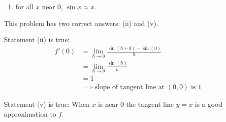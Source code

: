 \documentclass[nooutcomes,handout]{ximera}
\begin{document}
\begin{problem}
\begin{enumerate}
\begin{enumerate}
        \item
          for all $x$ near $0$, $\sin x \approx x$.
      \end{enumerate}
      \begin{freeResponse}
        This problem has two correct answers: (ii) and (v).

        Statement (ii) is true:
        \begin{align*}
          f'(0) &= \lim_{h \to 0} \frac{\sin (h + 0) - \sin (0)}{h} \\
                &= \lim_{h \to 0} \frac{\sin (h)}{h} \\
                &= 1\\
          &\implies \mbox{slope of tangent line at $(0,0)$ is $1$}
        \end{align*}

        Statement (v) is true:
        When $x$ is near $0$ the tangent line $y = x$ is a good approximation to $f$.
      \end{freeResponse}

  \end{enumerate}

	
\end{problem}	
	
\end{document}
